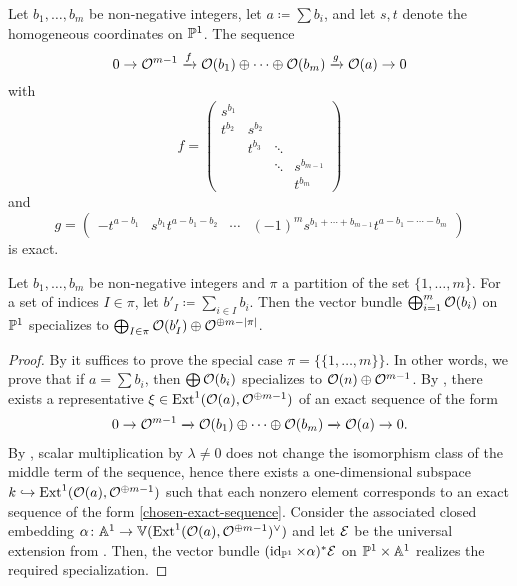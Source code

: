 \begin{remark} \label{rem:exact-sequence-exists}
	Let $b_1,\dotsc,b_m$ be non-negative integers, let $a\coloneqq \sum b_i$, and let $s,t$ denote the homogeneous coordinates on $\mathbb{P}^1$. The sequence
	\[ 0 \to \mathcal{O}^{m-1} \xrightarrow{f} \mathcal{O}(b_1)\oplus \dotsb \oplus \mathcal{O}(b_m) \xrightarrow{g} \mathcal{O}(a) \to 0 \]
	with \[
	f = \begin{pmatrix}
	s^{b_1}&        &	   &           \\
	t^{b_2}& s^{b_2}&      &           \\
	       & t^{b_3}&\ddots&           \\
	       &        &\ddots&s^{b_{m-1}}\\
	       &        &      &t^{b_m}
	\end{pmatrix} 
	\]
	and
	\[
	g = \begin{pmatrix}
	-t^{a-b_1} & s^{b_1}t^{a-b_1-b_2} & \cdots & (-1)^{m} s^{b_1 + \dotsb + b_{m-1}}t^{a-b_1-\dotsb-b_m}
	\end{pmatrix}
	\]
	is exact.
\end{remark}

\begin{proposition} \label{specialization-partitions}
	Let $b_1,\dotsc,b_m$ be non-negative integers and $\pi$ a partition of the set $\{1,\dotsc,m\}$. For a set of indices $I\in \pi$, let $b'_I \coloneqq \sum_{i \in I} b_i$. Then the vector bundle $\bigoplus_{i=1}^m \mathcal{O} (b_i)$ on $\mathbb{P}^1$ specializes to $\bigoplus_{I\in\pi} \mathcal{O}(b'_I) \oplus \mathcal{O}^{\oplus m-\lvert\pi\rvert}$.	
\end{proposition}

\begin{proof}
	By  it suffices to prove the special case $\pi = \{\{1,\dotsc,m\}\}$. In other words, we prove that if $a = \sum b_i$, then $\bigoplus\mathcal{O}(b_i)$ specializes to $\mathcal{O}(n)\oplus \mathcal{O}^{m-1}$. By , there exists a representative $\xi \in \operatorname{Ext}^1(\mathcal{O}(a),\mathcal{O}^{\oplus m-1})$ of an exact sequence of the form
	\begin{align} \label{chosen-exact-sequence}
		\sesarrows{\mc{O}^{m-1}}{}{\mc{O}(b_1)\oplus \dotsb \oplus \mc{O}(b_m)}{}{\mc{O}(a)}. %
	\end{align}
	By , scalar multiplication by $\lambda \neq 0$ does not change the isomorphism class of the middle term of the sequence, hence there exists a one-dimensional subspace $k \injectto \Ext^1(\mc{O}(a),\mc{O}^{\oplus m-1})$ such that each nonzero element corresponds to an exact sequence of the form
	\cref{chosen-exact-sequence}. Consider the associated closed embedding $\alpha \colon \mathbb{A}^1 \to \mathbb{V}(\operatorname{Ext}^1(\mathcal{O}(a),\mathcal{O}^{\oplus m-1})^\vee)$ and let $\mathcal{E}$ be the universal extension from . Then, the vector bundle $(\operatorname{id}_{\mathbb{P}^1}\times\alpha)^{*}\mathcal{E}$ on $\mathbb{P}^1\times\mathbb{A}^1$ realizes the required specialization. 
\end{proof}

